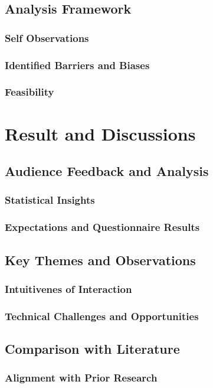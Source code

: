 \documentclass[a4paper, 12pt]{report}
\begin{document}
    \section{Analysis Framework}
        \subsection{Self Observations}
        \subsection{Identified Barriers and Biases}
        \subsection{Feasibility}
    

\chapter{Result and Discussions}
    \section{Audience Feedback and Analysis}
        \subsection{Statistical Insights}
        \subsection{Expectations and Questionnaire Results}
    \section{Key Themes and Observations}
        \subsection{Intuitivenes of Interaction}
        \subsection{Technical Challenges and Opportunities}
    \section{Comparison with Literature}
        \subsection{Alignment with Prior Research}
\end{document}
